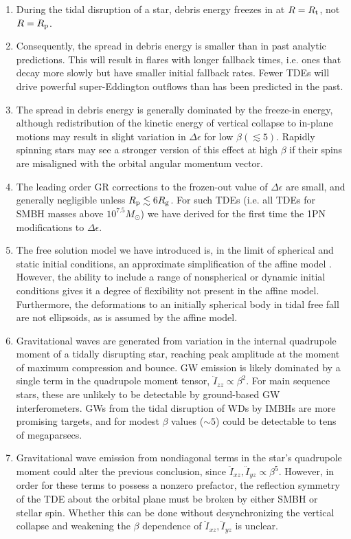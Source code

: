 \documentclass[useAMS, twocolumn, usenatbib]{mn2e}
\begin{document}
\begin{enumerate}
\item During the tidal disruption of a star, debris energy freezes in at $R=R_{\rm t}$, not $R=R_{\rm p}$.
\item Consequently, the spread in debris energy is smaller than in past analytic predictions.  This will result in flares with longer fallback times, i.e. ones that decay more slowly but have smaller initial fallback rates.  Fewer TDEs will drive powerful super-Eddington outflows than has been predicted in the past.
\item The spread in debris energy is generally dominated by the freeze-in energy, although redistribution of the kinetic energy of vertical collapse to in-plane motions may result in slight variation in $\Delta\epsilon$ for low $\beta (\lesssim 5)$.  Rapidly spinning stars may see a stronger version of this effect at high $\beta$ if their spins are misaligned with the orbital angular momentum vector.
\item The leading order GR corrections to the frozen-out value of $\Delta \epsilon$ are small, and generally negligible unless $R_{\rm p} \lesssim 6R_{\rm g}$.  For such TDEs (i.e. all TDEs for SMBH masses above $10^{7.5}M_{\odot}$) we have derived for the first time the 1PN modifications to $\Delta \epsilon$.  
\item The free solution model we have introduced is, in the limit of spherical and static initial conditions, an approximate simplification of the affine model .  However, the ability to include a range of nonspherical or dynamic initial conditions gives it a degree of flexibility not present in the affine model.  Furthermore, the deformations to an initially spherical body in tidal free fall are not ellipsoids, as is assumed by the affine model.
\item Gravitational waves are generated from variation in the internal quadrupole moment of a tidally disrupting star, reaching peak amplitude at the moment of maximum compression and bounce.  GW emission is likely dominated by a single term in the quadrupole moment tensor, $\ddot{I}_{zz}\propto \beta^2$.  For main sequence stars, these are unlikely to be detectable by ground-based GW interferometers.  GWs from the tidal disruption of WDs by IMBHs are more promising targets, and for modest $\beta$ values ($\sim 5$) could be detectable to tens of megaparsecs.
\item Gravitational wave emission from nondiagonal terms in the star's quadrupole moment could alter the previous conclusion, since $\ddot{I}_{xz}, \ddot{I}_{yz} \propto \beta^5$.  However, in order for these terms to possess a nonzero prefactor, the reflection symmetry of the TDE about the orbital plane must be broken by either SMBH or stellar spin.  Whether this can be done without desynchronizing the vertical collapse and weakening the $\beta$ dependence of $\ddot{I}_{xz}, \ddot{I}_{yz}$ is unclear.
\end{enumerate}
\end{document}
